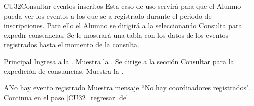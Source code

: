 \begin{UseCase}{CU32}{Consultar eventos inscritos}{
		\noindent Esta caso de uso servirá para que el Alumno pueda ver los eventos a los que se a registrado durante el periodo de inscripciones.
		Para ello el Alumno se dirigirá a la  seleccionando Consulta para expedir constancias. Se le mostrará una tabla con los datos de los eventos registrados hasta el momento de la consulta.
	} \label{CU32_evento}

		\end{UseCase}
	
    \begin{UCtrayectoria}{Principal}
    \UCpaso[\UCactor] Ingresa a la .
    \UCpaso Muestra la . \label{CU32_regresar}
    \UCpaso[\UCactor] Se dirige a la sección Consultar para la expedición de constancias.  
    \UCpaso Muestra la . 
    \end{UCtrayectoria}
    
    \begin{UCtrayectoriaA}{A}{No hay evento registrado}
    	\UCpaso Muestra mensaje “No hay coordinadores registrados".
    	\UCpaso Continua en el paso \ref{CU32_regresar} del .
    \end{UCtrayectoriaA}


	


